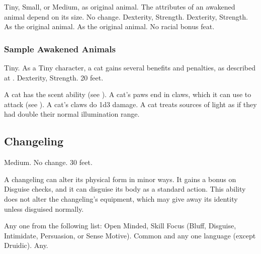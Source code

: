          Tiny, Small, or Medium, as original animal.
         The attributes of an awakened animal depend on its size.
         No change.
          Dexterity,  Strength.
          Dexterity,  Strength.
         As the original animal.
         As the original animal.
         No racial bonus feat.

        \subsubsection{Sample Awakened Animals}


             Tiny. As a Tiny character, a cat gains several benefits and penalties, as described at .
              Dexterity,  Strength.
             20 feet.
            \begin{itemize}
                 A cat has the scent ability (see ).
                 A cat's paws end in claws, which it can use to attack (see ). A cat's claws do 1d3 damage.
                 A cat treats sources of light as if they had double their normal illumination range.
            \end{itemize}

        \subsection{Changeling}

             Medium.
             No change.
             30 feet.
            \begin{itemize}
                 A changeling can alter its physical form in minor ways. It gains a  bonus on Disguise checks, and it can disguise its body as a standard action. This ability does not alter the changeling's equipment, which may give away its identity unless disguised normally.
            \end{itemize}
             Any one from the following list: Open Minded, Skill Focus (Bluff, Disguise, Intimidate, Persuasion, or Sense Motive).
             Common and any one language (except Druidic).
             Any.


